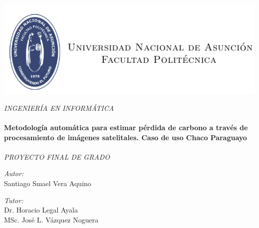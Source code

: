 \documentclass[11pt, a4paper, oneside]{Thesis} %
\begin{document}
\begin{titlepage}
\begin{center}
\includegraphics[scale=1]{./Figures/logo.png} %

\large \textit{INGENIERÍA EN INFORMÁTICA}\\[0.3cm]

\HRule \\[0.4cm] %
{\huge \bfseries Metodolog\'ia autom\'atica para estimar p\'erdida de
	carbono a trav\'es de procesamiento de im\'agenes
	satelitales. Caso de uso Chaco Paraguayo}\\[0.4cm] %
\HRule \\[1.5cm] %
 
\large \textit{PROYECTO FINAL DE GRADO}\\[0.3cm]
 

 \vfill
 
\vfill

\vfill

\begin{minipage}{0.4\textwidth}
\begin{center} \large
\emph{Autor:}\\
{Santiago Smael Vera Aquino}
\end{center}
\end{minipage} 
 \hfill\begin{minipage}{0.4\textwidth}
\begin{center} \large
\emph{Tutor:}\\ 
{Dr. Horacio Legal Ayala} \\
{MSc. Jos\'e L. V\'azquez Noguera} \\
\end{center}
\end{minipage}\\[3cm]



\end{center}
\end{titlepage}
\end{document}
